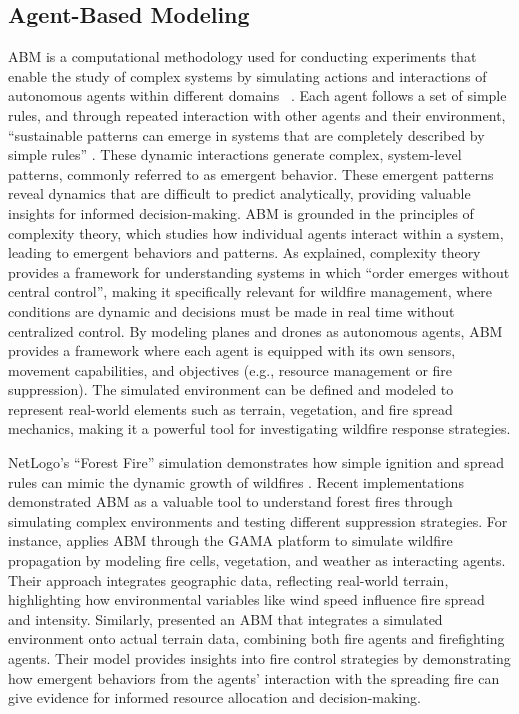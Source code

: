 \documentclass[11pt, a4paper]{article}
\begin{document}
\subsection{Agent-Based Modeling}
ABM is a computational methodology used for conducting experiments that enable the study of complex systems by simulating actions and interactions of autonomous agents within different domains  \citep{wilensky2015introduction}. Each agent follows a set of simple rules, and through repeated interaction with other agents and their environment, ``sustainable patterns can emerge in systems that are completely described by simple rules'' \citep[p.5]{intro_to_abm}. These dynamic interactions generate complex, system-level patterns, commonly referred to as emergent behavior. These emergent patterns reveal dynamics that are difficult to predict analytically, providing valuable insights for informed decision-making.
ABM is grounded in the principles of complexity theory, which studies how individual agents interact within a system, leading to emergent behaviors and patterns. As \citet*{wilensky2015introduction} explained, complexity theory provides a framework for understanding systems in which ``order emerges without central control'', making it specifically relevant for wildfire management, where conditions are dynamic and decisions must be made in real time without centralized control. By modeling planes and drones as autonomous agents, ABM provides a framework where each agent is equipped with its own sensors, movement capabilities, and objectives (e.g., resource management or fire suppression). The simulated environment can be defined and modeled to represent real-world elements such as terrain, vegetation, and fire spread mechanics, making it a powerful tool for investigating wildfire response strategies.

NetLogo's ``Forest Fire'' simulation demonstrates how simple ignition and spread rules can mimic the dynamic growth of wildfires \citep{wilensky2015introduction}. Recent implementations demonstrated ABM as a valuable tool to understand forest fires through simulating complex environments and testing different suppression strategies. For instance, \citet*{MorenoEspino2025} applies ABM through the GAMA platform \citep{Gamma} to simulate wildfire propagation by modeling fire cells, vegetation, and weather as interacting agents. Their approach integrates geographic data, reflecting real-world terrain, highlighting how environmental variables like wind speed influence fire spread and intensity. Similarly, \citet*{Dorrer_2020} presented an ABM that integrates a simulated environment onto actual terrain data, combining both fire agents and firefighting agents. Their model provides insights into fire control strategies by demonstrating how emergent behaviors from the agents' interaction with the spreading fire can give evidence for informed resource allocation and decision-making.
\end{document}
